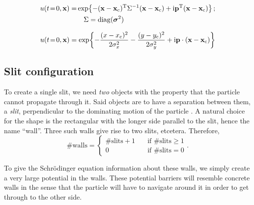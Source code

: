     \begin{equation}\label{eq:p4_initial_condition}
    \begin{split}
        u(t\!=\!0, \mathbf{x}) = & \exp{-(\mathbf{x}-\mathbf{x}_\mathrm{c})^\mathrm{T}\Sigma^{-1}(\mathbf{x}-\mathbf{x}_\mathrm{c}) + \mathrm{i}\mathbf{p}^\mathrm{T}(\mathbf{x}-\mathbf{x}_\mathrm{c})} \,;  \\ 
        &\quad\Sigma = \mathrm{diag}(\boldsymbol{\sigma}^2)  
    \end{split}
    \end{equation}
 
    \begin{equation}\label{eq:p4_initial_condition_scalarform}
        u(t\!=\!0, \mathbf{x}) = \exp{-\frac{(x-x_\mathrm{c})^2}{2\sigma_x^2} -\frac{(y-y_\mathrm{c})^2}{2\sigma_y^2} + \mathrm{i}\mathbf{p}\cdot (\mathbf{x}-\mathbf{x}_\mathrm{c})}
    \end{equation}


\subsection{Slit configuration}\label{sec:method:slit_config}
    To create a single slit, we need \textit{two} objects with the property that the particle cannot propagate through it. Said objects are to have a separation between them, a \textit{slit}, perpendicular to the dominating motion of the particle . A natural choice for the shape is the rectangular with the longer side parallel to the slit,  hence the name ``wall''. Three such walls give rise to two slits, etcetera. Therefore, 
    \begin{equation}
        \#\mathrm{walls} = \begin{cases}
            \#\mathrm{slits} + 1 \quad &\mathrm{if}\,\, \#\mathrm{slits} \geq 1 \\
            0 \quad                     &\mathrm{if}\,\, \#\mathrm{slits} =0 
        \end{cases}.
    \end{equation}

    To give the Schrödinger equation information about these walls, we simply create a very large potential in the walls. These potential barriers will resemble concrete  walls in the sense that the particle will have to navigate around it in order to get through to the other side.

